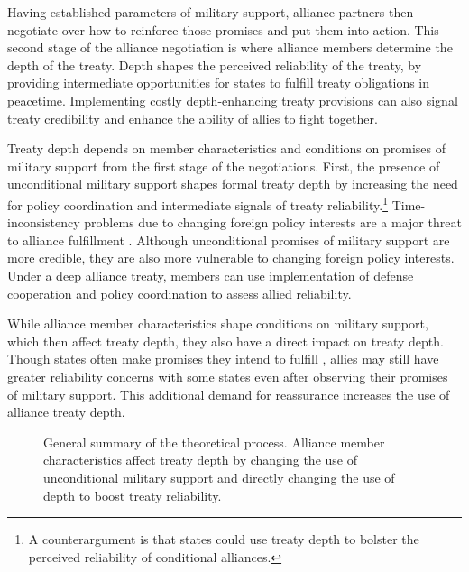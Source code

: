 \documentclass[12pt]{article}
\begin{document}
Having established parameters of military support, alliance partners then negotiate over how to reinforce those promises and put them into action. 
This second stage of the alliance negotiation is where alliance members determine the depth of the treaty. 
Depth shapes the perceived reliability of the treaty, by providing intermediate opportunities for states to fulfill treaty obligations in peacetime. 
Implementing costly depth-enhancing treaty provisions can also signal treaty credibility and enhance the ability of allies to fight together. 


Treaty depth depends on member characteristics and conditions on promises of military support from the first stage of the negotiations.
First, the presence of unconditional military support shapes formal treaty depth by increasing the need for policy coordination and intermediate signals of treaty reliability.\footnote{A counterargument is that states could use treaty depth to bolster the perceived reliability of conditional alliances.}
Time-inconsistency problems due to changing foreign policy interests are a major threat to alliance fulfillment 
\citep{LeedsSavun2007}. 
Although unconditional promises of military support are more credible, they are also more vulnerable to changing foreign policy interests. 
Under a deep alliance treaty, members can use implementation of defense cooperation and policy coordination to assess allied reliability. 


While alliance member characteristics shape conditions on military support, which then affect treaty depth, they also have a direct impact on treaty depth.  
Though states often make promises they intend to fulfill \citep{DownsRockeBarsoom1996, Chibaetal2015}, allies may still have greater reliability concerns with some states even after observing their promises of military support. 
This additional demand for reassurance increases the use of alliance treaty depth. 


\begin{figure}
\begin{center}
 \caption{General summary of the theoretical process. Alliance member characteristics affect treaty depth by changing the use of unconditional military support and directly changing the use of depth to boost treaty reliability.}
  \label{fig:theory-flow}
\end{center} 
\end{figure}
\end{document}
